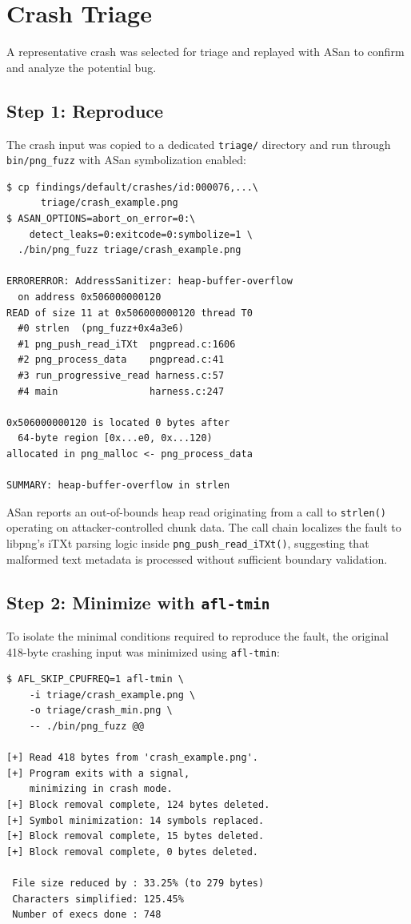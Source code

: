 \section{Crash Triage}

A representative crash was selected for triage and
replayed with ASan to confirm and analyze
the potential bug.


\subsection{Step 1: Reproduce}

The crash input was copied to a dedicated \texttt{triage/} directory and run
through \texttt{bin/png\_fuzz} with ASan symbolization enabled:

{\scriptsize
\begin{lstlisting}[style=terminal]
$ cp findings/default/crashes/id:000076,...\
      triage/crash_example.png
$ ASAN_OPTIONS=abort_on_error=0:\
    detect_leaks=0:exitcode=0:symbolize=1 \
  ./bin/png_fuzz triage/crash_example.png

ERRORERROR: AddressSanitizer: heap-buffer-overflow
  on address 0x506000000120
READ of size 11 at 0x506000000120 thread T0
  #0 strlen  (png_fuzz+0x4a3e6)
  #1 png_push_read_iTXt  pngpread.c:1606
  #2 png_process_data    pngpread.c:41
  #3 run_progressive_read harness.c:57
  #4 main                harness.c:247

0x506000000120 is located 0 bytes after
  64-byte region [0x...e0, 0x...120)
allocated in png_malloc <- png_process_data

SUMMARY: heap-buffer-overflow in strlen
\end{lstlisting}
}

ASan reports an out-of-bounds heap read originating from a
call to \texttt{strlen()} operating on attacker-controlled chunk data. The call chain localizes the fault to libpng's
iTXt parsing logic inside
\texttt{png\_push\_read\_iTXt()}, suggesting that malformed
text metadata is processed without sufficient boundary
validation.

\subsection{Step 2: Minimize with \texttt{afl-tmin}}

To isolate the minimal conditions required to reproduce the
fault, the original 418-byte crashing input was minimized
using \texttt{afl-tmin}:

{\scriptsize
\begin{lstlisting}[style=terminal]
$ AFL_SKIP_CPUFREQ=1 afl-tmin \
    -i triage/crash_example.png \
    -o triage/crash_min.png \
    -- ./bin/png_fuzz @@
    
[+] Read 418 bytes from 'crash_example.png'.
[+] Program exits with a signal,
    minimizing in crash mode.
[+] Block removal complete, 124 bytes deleted.
[+] Symbol minimization: 14 symbols replaced.
[+] Block removal complete, 15 bytes deleted.
[+] Block removal complete, 0 bytes deleted.

 File size reduced by : 33.25% (to 279 bytes)
 Characters simplified: 125.45%
 Number of execs done : 748
\end{lstlisting}
}

